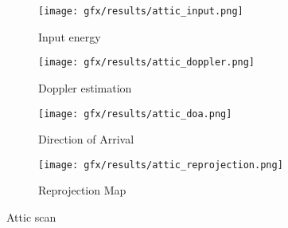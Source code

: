 \begin{table}
\begin{tabular} { l @{}c@{} @{}c@{} @{}c@{} @{}c@{} @{}c@{} @{}c@{} }


\end{tabular}
\end{table}


\begin{figure}
    \begin{subfigure}[b]{0.25\textwidth}
        \centering
        \texttt{[image: gfx/results/attic\_input.png]}
        \caption{\small Input energy}
    \end{subfigure}%
    \begin{subfigure}[b]{0.25\textwidth}  
        \centering 
        \texttt{[image: gfx/results/attic\_doppler.png]}
        \caption{\small Doppler estimation}
    \end{subfigure}%
    \begin{subfigure}[b]{0.25\textwidth}   
        \centering 
        \texttt{[image: gfx/results/attic\_doa.png]}
        \caption{\small Direction of Arrival}
    \end{subfigure}%
    \begin{subfigure}[b]{0.25\textwidth}   
        \centering 
        \texttt{[image: gfx/results/attic\_reprojection.png]}
        \caption{\small Reprojection Map}
    \end{subfigure}%
    \caption{Attic scan}
\end{figure}

